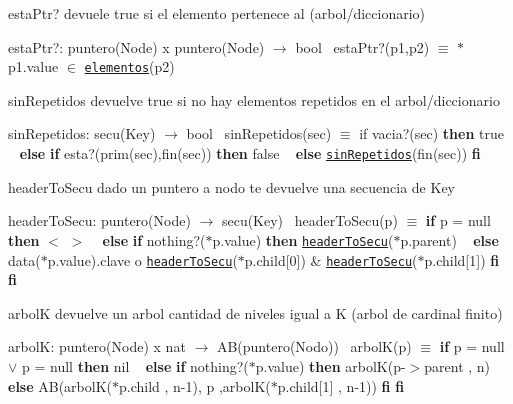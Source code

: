 \begin{DoxyParagraph}{esta\+Ptr?}
devuele true si el elemento pertenece al (arbol/diccionario)

esta\+Ptr?\+: puntero(\+Node) x puntero(\+Node) $\to$ bool~\newline
 esta\+Ptr?(p1,p2) $\equiv$ $\ast$p1.value $\in$ \href{axiomas.html#elementos}{\tt elementos}(p2) 
\end{DoxyParagraph}


\begin{DoxyParagraph}{sin\+Repetidos}
devuelve true si no hay elementos repetidos en el arbol/diccionario

sin\+Repetidos\+: secu(\+Key) $\to$ bool~\newline
 sin\+Repetidos(sec) $\equiv$ if vacia?(sec) {\bfseries then} true ~\newline
 {\bfseries else} {\bfseries if} esta?(prim(sec),fin(sec)) {\bfseries then} false ~\newline
 {\bfseries else} \href{axiomas.html#sinRepetidos}{\tt sin\+Repetidos}(fin(sec)) {\bfseries fi} 
\end{DoxyParagraph}


\begin{DoxyParagraph}{header\+To\+Secu}
dado un puntero a nodo te devuelve una secuencia de Key

header\+To\+Secu\+: puntero(\+Node) $\to$ secu(\+Key)~\newline
 header\+To\+Secu(p) $\equiv$ {\bfseries if} p = null {\bfseries then} $<$ $>$ ~\newline
 {\bfseries else} {\bfseries if} nothing?($\ast$p.value) {\bfseries then} \href{axiomas.html#headerToSecu}{\tt header\+To\+Secu}($\ast$p.parent) ~\newline
 {\bfseries else} data($\ast$p.value).clave o \href{axiomas.html#headerToSecu}{\tt header\+To\+Secu}($\ast$p.child\mbox{[}0\mbox{]}) \& \href{axiomas.html#headerToSecu}{\tt header\+To\+Secu}($\ast$p.child\mbox{[}1\mbox{]}) {\bfseries fi} {\bfseries fi} 
\end{DoxyParagraph}


\begin{DoxyParagraph}{arbolK}
devuelve un arbol cantidad de niveles igual a K (arbol de cardinal finito)

arbolK\+: puntero(\+Node) x nat $\to$ A\+B(puntero(\+Nodo))~\newline
 arbol\+K(p) $\equiv$ {\bfseries if} p = null $\lor$ p = null {\bfseries then} nil ~\newline
 {\bfseries else} {\bfseries if} nothing?($\ast$p.value) {\bfseries then} arbolK(p-\/$>$parent , n) ~\newline
 {\bfseries else} AB(arbolK($\ast$p.child , n-\/1), p ,arbolK($\ast$p.child\mbox{[}1\mbox{]} , n-\/1)) {\bfseries fi} {\bfseries fi} 
\end{DoxyParagraph}


